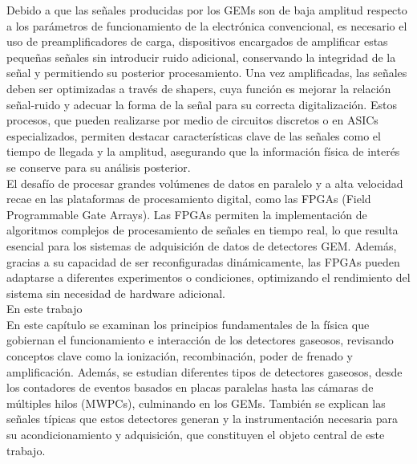 \documentclass{article}
\begin{document}
\noindent Debido a que las señales producidas por los GEMs son de baja amplitud respecto a los parámetros de funcionamiento de la electrónica convencional, es necesario el uso de preamplificadores de carga, dispositivos encargados de amplificar estas pequeñas señales sin introducir ruido adicional, conservando la integridad de la señal y permitiendo su posterior procesamiento. Una vez amplificadas, las señales deben ser optimizadas a través de shapers, cuya función es mejorar la relación señal-ruido y adecuar la forma de la señal para su correcta digitalización. Estos procesos, que pueden realizarse por medio de circuitos discretos o en ASICs especializados, permiten destacar características clave de las señales como el tiempo de llegada y la amplitud, asegurando que la información física de interés se conserve para su análisis posterior.\\

\noindent El desafío de procesar grandes volúmenes de datos en paralelo y a alta velocidad recae en las plataformas de procesamiento digital, como las FPGAs (Field Programmable Gate Arrays). Las FPGAs permiten la implementación de algoritmos complejos de procesamiento de señales en tiempo real, lo que resulta esencial para los sistemas de adquisición de datos de detectores GEM. Además, gracias a su capacidad de ser reconfiguradas dinámicamente, las FPGAs pueden adaptarse a diferentes experimentos o condiciones, optimizando el rendimiento del sistema sin necesidad de hardware adicional.\\

\noindent \noindent En este trabajo \\

\noindent En este capítulo se examinan los principios fundamentales de la física que gobiernan el funcionamiento e interacción de los detectores gaseosos, revisando conceptos clave como la ionización, recombinación, poder de frenado y amplificación. Además, se estudian diferentes tipos de detectores gaseosos, desde los contadores de eventos basados en placas paralelas hasta las cámaras de múltiples hilos (MWPCs), culminando en los GEMs. También se explican las señales típicas que estos detectores generan y la instrumentación necesaria para su acondicionamiento y adquisición, que constituyen el objeto central de este trabajo.
\end{document}
